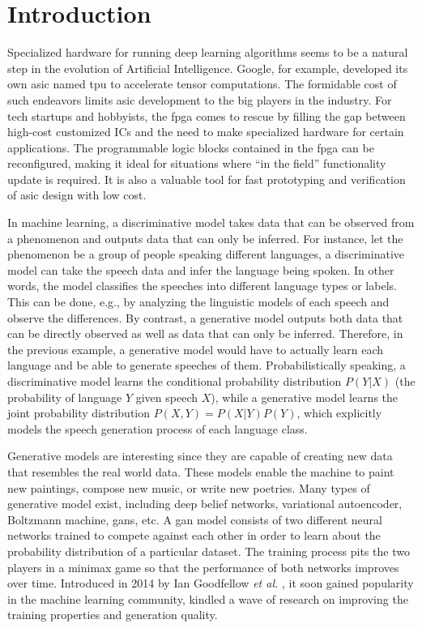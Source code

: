 
\chapter{Introduction}

Specialized hardware for running deep learning algorithms seems to be a natural step in the evolution of
Artificial Intelligence.  Google, for example, developed its own \gls{asic} named \gls{tpu}
to accelerate tensor computations. The formidable cost of such endeavors limits \gls{asic} development to
the big players in the industry. For tech startups and hobbyists, the \gls{fpga} comes to rescue by filling
the gap between high-cost customized ICs and the need to make specialized hardware for certain
applications. The programmable logic blocks contained in the \gls{fpga} can be reconfigured, making it
ideal for situations where "`in the field"' functionality update is required. It is also a valuable tool
for fast prototyping and verification of \gls{asic} design with low cost.

In machine learning, a discriminative model takes data that can be observed from a phenomenon and outputs
data that can only be inferred. For instance, let the phenomenon be a group of people speaking different
languages, a discriminative model can take the speech data and infer the language being spoken. In other
words, the model classifies the speeches into different language types or labels. This can be done, e.g.,
by analyzing the linguistic models of each speech and observe the differences. By contrast, a generative
model outputs both data that can be directly observed as well as data that can only be inferred. Therefore,
in the previous example, a generative model would have to actually learn each language and be able to generate
speeches of them. Probabilistically speaking, a discriminative model learns the conditional probability
distribution $P(Y \vert X)$ (the probability of language $Y$ given speech $X$), while a generative model
learns the joint probability distribution $P(X,Y) = P(X \vert Y)P(Y)$, which explicitly models the speech
generation process of each language class.

Generative models are interesting since they are capable of creating new data that resembles the real world
data. These models enable the machine to paint new paintings, compose new music, or write new poetries.
Many types of generative model exist, including deep belief networks, variational autoencoder,
Boltzmann machine, \glspl{gan}, etc. A \gls{gan} model consists of two different neural networks trained to
compete against each other in order to learn about the probability distribution of a particular dataset.
The training process pits the two players in a minimax game so that the performance of both networks improves
over time. Introduced in 2014 by Ian Goodfellow \textit{et al.} \cite{goodfellow:gan}, it soon gained
popularity in the machine learning community, kindled a wave of research on improving the training properties
and generation quality.


